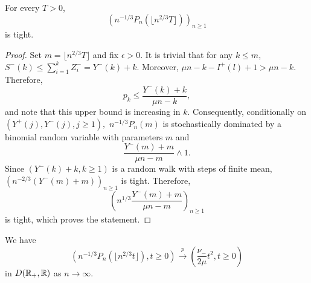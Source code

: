 \begin{lemma}\label{lemma.tightnesssurplusedges}
 For every $T>0$, $$\left(n^{-1/3}P_n\left(\lfloor  n^{2/3}T\rfloor \right) \right)_{n\geq 1}$$ 
 is tight.
 \end{lemma}
 \begin{proof}
Set $m=\lfloor  n^{2/3}T\rfloor$ and fix $\epsilon>0$. It is trivial that for any $k\leq m$, $S^{-}(k)\leq \sum_{i=1}^k Z^-_i=Y^-(k)+k$. Moreover, $\mu n - k -I^{+}(l)+1>\mu n-k$.  Therefore, $$p_k\leq \frac{Y^-(k)+k}{\mu n - k},$$
and note that this upper bound is increasing in $k$. Consequently, conditionally on $(Y^+(j),Y^-(j),j\geq 1),$ $n^{-1/3}P_n(m)$ is stochastically dominated by a binomial random variable with parameters  $m$ and $$\frac{Y^-(m)+m}{\mu n - m}\wedge 1.$$
Since $(Y^-(k)+k,k\geq 1)$ is a random walk with steps of finite mean, $\left(n^{-2/3}(Y^-(m)+m)\right)_{n\geq 1}$ is tight. Therefore,
$$\left(n^{1/3} \frac{Y^-(m)+m}{\mu n - m}\right)_{n\geq 1}$$ is tight, which proves the statement.
\end{proof}
\begin{lemma}\label{lemma.convergenceQandP}
We have  
$$\left(n^{-1/3}P_n(\lfloor n^{2/3}t\rfloor), t \geq 0\right)\overset{p}{\to} \left(\frac{\nu_-}{2\mu} t^2, t\geq 0\right)$$
in $D({\mathbb R}_+,{\mathbb R})$ as $n\to \infty$.

\end{lemma}
